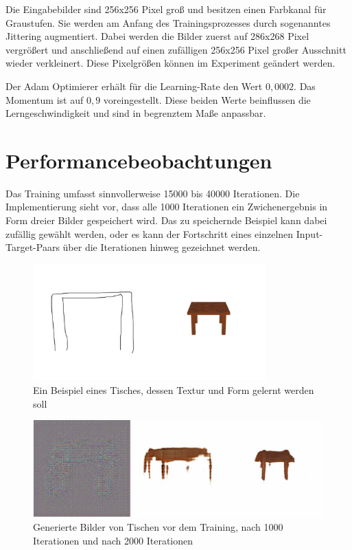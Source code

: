 Die Eingabebilder sind 256x256 Pixel groß und besitzen einen Farbkanal für Graustufen. Sie werden am Anfang des Trainingsprozesses durch sogenanntes Jittering augmentiert. Dabei werden die Bilder zuerst auf 286x268 Pixel vergrößert und anschließend auf einen zufälligen 256x256 Pixel großer Ausschnitt wieder verkleinert. Diese  Pixelgrößen können im Experiment geändert werden.

Der Adam Optimierer \cite{kingma2017adam} erhält für die Learning-Rate den Wert $0,0002$. Das Momentum ist auf $0,9$ voreingestellt. Diese beiden Werte beinflussen die Lerngeschwindigkeit und sind in begrenztem Maße anpassbar.

\section{Performancebeobachtungen}
\label{sec:performance}
Das Training umfasst sinnvollerweise 15000 bis 40000 Iterationen. Die Implementierung sieht vor, dass alle 1000 Iterationen ein Zwichenergebnis in Form dreier Bilder gespeichert wird. Das zu speichernde Beispiel kann dabei zufällig gewählt werden, oder es kann der Fortschritt eines einzelnen Input-Target-Paars über die Iterationen hinweg gezeichnet werden.

\begin{figure}[h]
  \centering
	\includegraphics[width=0.8\textwidth]{bilder/pix2pix_progress/394_input.png}
  \caption[Quadratischer Tisch]{Ein Beispiel eines Tisches, dessen Textur und Form gelernt werden soll}
  \label{fig:trainingexample}
\end{figure}

\begin{figure}[h]
	\centering
	\includegraphics[width=1.0\textwidth]{bilder/pix2pix_progress/progress_tables.png}
	\caption[Lernfortschritt am Beispiel von Tischen]{Generierte Bilder von Tischen vor dem Training, nach 1000 Iterationen und nach 2000 Iterationen}
	\label{fig:pix2pixprogress1}
\end{figure}

